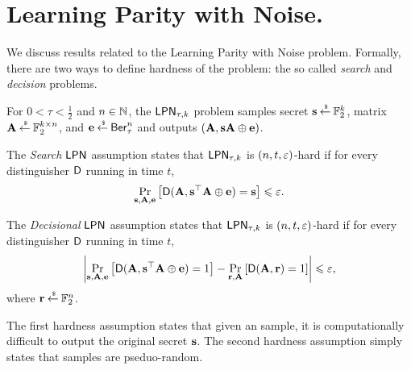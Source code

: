\section{Learning Parity with Noise.}
We discuss results related to the Learning Parity with Noise problem.
Formally, there are two ways to define hardness of the \LPN problem: the so called {\em search} and {\em decision} \LPN problems.

\begin{definition}
	For $0 < \tau < \frac{1}{2}$ and $n \in {\mathbb N}$, the $\mathsf{LPN}_{\tau, k}$ problem samples secret ${\mathbf s} \mathbin{\stackrel{\mbox{\,\tiny \$}}{\gets}} {\mathbb F}_2^k$, matrix ${\mathbf A} \mathbin{\stackrel{\mbox{\,\tiny \$}}{\gets}} {\mathbb F}_2^{k \times n}$, and ${\mathbf e} \mathbin{\stackrel{\mbox{\,\tiny \$}}{\gets}} \mathsf{Ber}_\tau^{n}$ and outputs $({\mathbf A}, {\mathbf s}{\mathbf A}\oplus {\mathbf e})$.
	
	The {\em Search} $\mathsf{LPN}$ assumption states that $\mathsf{LPN}_{\tau, k}$ is $(n, t, \varepsilon)$-hard if for every distinguisher $\mathsf{D}$ running in time $t$,
	\begin{align*}
		\underset{{\mathbf s},{\mathbf A},{\mathbf e}}{\Pr}\left[\mathsf{D}({\mathbf A},{\mathbf s}^\top{\mathbf A}\oplus{\mathbf e})={\mathbf s}\right] \leqslant \varepsilon.
	\end{align*}
	
	The {\em Decisional} $\mathsf{LPN}$ assumption states that $\mathsf{LPN}_{\tau, k}$ is $(n, t, \varepsilon)$-hard if for every distinguisher $\mathsf{D}$ running in time $t$,
	\begin{align*}
		\abs{\underset{\bs,\bA,\be}{\Pr}\left[\pred{D}(\bA,\bs^\top\bA\oplus\be)=1\right] - \underset{\br, \bA}{\Pr}\left[\pred{D}(\bA,\br)=1\right] }\leq \eps,
	\end{align*}
	where ${\mathbf r} \mathbin{\stackrel{\mbox{\,\tiny \$}}{\gets}} {\mathbb F}_2^n$.
\end{definition}
The first hardness assumption states that given an \LPN sample, it is computationally difficult to output the original secret ${\mathbf s}$.
The second hardness assumption simply states that \LPN samples are pseduo-random.

